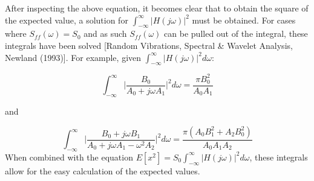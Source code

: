 \documentclass[12pt,letter]{article}
\numberwithin{ex}{section} %
\numberwithin{re}{section} %
\begin{document}
After inspecting the above equation, it becomes clear that to obtain the square of the expected value, a solution for  $\int_{-\infty}^{\infty} |H(j\omega)|^2$ must be obtained. For cases where $S_{ff}(\omega) = S_0$ and as such $S_{ff}(\omega)$ can be pulled out of the integral, these integrals have been solved [Random Vibrations, Spectral \& Wavelet Analysis, Newland (1993)]. For example, given $\int_{-\infty}^{\infty} |H(j\omega)|^2 d\omega$:

\begin{equation}
\int_{-\infty}^{\infty} \bigg|\frac{B_0}{A_0+j \omega A_1} \bigg|^2 d\omega = \frac{\pi B_0^2}{A_0 A_1}
\end{equation} 

and

\begin{equation}
\int_{-\infty}^{\infty} \bigg|\frac{B_0 + j \omega B_1}{A_0+j \omega A_1 - \omega^2 A_2} \bigg|^2 d\omega = \frac{\pi (A_0 B_1^2 + A_2 B_0^2)}{A_0 A_1 A_2}
\end{equation} 
When combined with the equation $E[x^2] = S_{0} \int_{-\infty}^{\infty} |H(j\omega)|^2 d\omega$, these integrals allow for the easy calculation of the expected values. 
\end{document}
